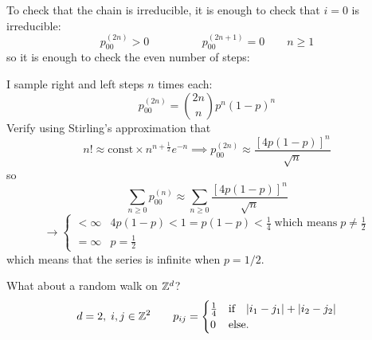 \documentclass{article}
\begin{document}
    \begin{proof2}
        To check that the chain is irreducible, it is enough to check that $i=0$ is irreducible:
        \[p_{00}^{(2n)}>0 \hspace{2cm}  p_{00}^{(2n+1)}=0 \qquad n\geqslant 1\] so it is enough to check the even number of steps:
        \begin{center}
        \end{center}
        I sample right and left steps $n$ times each:
        \[p_{00}^{(2n)}=\binom{2n}{n}p^n(1-p)^n\]
        Verify using Stirling's approximation that
        \[n!\approx \text{const}\times n^{n+\frac{1}{2}}e^{-n}\implies p_{00}^{(2n)}\approx \frac{[4p(1-p)]^n}{\sqrt{n}}\]
        so
        \[
            \sum_{n\geqslant 0}p_{00}^{(n)}\approx  \sum_{n\geqslant 0}\frac{[4p(1-p)]^n}{\sqrt{n}}
            \]
            \[
            \rightarrow\begin{cases}
                <\infty &4p(1-p)<1=p(1-p)<\frac{1}{4}\; \text{which means}\;p\neq \frac{1}{2}\\
                =\infty &p=\frac{1}{2}
            \end{cases}
            \]
        which means that the series is infinite when $p=1/2$.
    \end{proof2}
What about a random walk on $\mathbb{Z}^d$? 
\[
d=2,\; i,j\in\mathbb{Z}^2 \qquad p_{ij}=\begin{cases}
    \frac{1}{4} &\text{if}\quad|i_1-j_1|+|i_2-j_2|\\
    0 &\text{else}.
\end{cases}
\]
\end{document}
